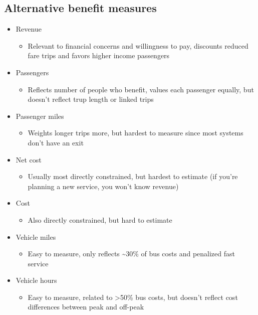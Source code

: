 \documentclass[11pt]{article}
\begin{document}
\subsection{Alternative benefit measures}
\label{sec:orgfa3ab22}
\begin{itemize}
\item Revenue
\begin{itemize}
\item Relevant to financial concerns and willingness to pay, discounts reduced fare trips and favors higher income passengers
\end{itemize}
\item Passengers
\begin{itemize}
\item Reflects number of people who benefit, values each passenger equally, but doesn't reflect trup length or linked trips
\end{itemize}
\item Passenger miles
\begin{itemize}
\item Weights longer trips more, but hardest to measure since most systems don't have an exit
\end{itemize}
\item Net cost
\begin{itemize}
\item Usually most directly constrained, but hardest to estimate (if you're planning a new service, you won't know revenue)
\end{itemize}
\item Cost
\begin{itemize}
\item Also directly constrained, but hard to estimate
\end{itemize}
\item Vehicle miles
\begin{itemize}
\item Easy to measure, only reflects \textasciitilde{}30\% of bus costs and penalized fast service
\end{itemize}
\item Vehicle hours
\begin{itemize}
\item Easy to measure, related to >50\% bus costs, but doesn't reflect cost differences between peak and off-peak
\end{itemize}
\end{itemize}
\end{document}
